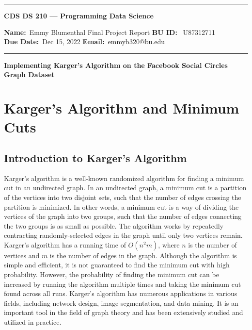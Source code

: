 \documentclass[10pt]{article}
\begin{document}
\begin{center}
	\hrule
	\vspace{.4cm}
	{\textbf { \large CDS DS 210 --- Programming Data Science}}
\end{center}
{\textbf{Name:}\ Emmy Blumenthal \hspace{\fill} Final Project Report\hspace{\fill}  \textbf{BU ID:} \ U87312711 \\
\textbf{Due Date:}\  Dec 15, 2022   \hspace{\fill} \textbf{Email:}\ emmyb320@bu.edu \ 
\vspace{.4cm}
\hrule

\begin{center}
	\Large 
	{
	\bf
	Implementing Karger's Algorithm on the Facebook Social Circles Graph Dataset
	}
\end{center}

\tableofcontents


\section{Karger's Algorithm and Minimum Cuts}

\subsection{Introduction to Karger's Algorithm}

Karger's algorithm is a well-known randomized algorithm for finding a minimum cut in an undirected graph.
In an undirected graph, a minimum cut is a partition of the vertices into two disjoint sets, such that the number of edges crossing the partition is minimized. In other words, a minimum cut is a way of dividing the vertices of the graph into two groups, such that the number of edges connecting the two groups is as small as possible.
The algorithm works by repeatedly contracting randomly-selected edges in the graph until only two vertices remain.
Karger's algorithm has a running time of $O(n^2m)$, where $n$ is the number of vertices and $m$ is the number of edges in the graph. Although the algorithm is simple and efficient, it is not guaranteed to find the minimum cut with high probability. However, the probability of finding the minimum cut can be increased by running the algorithm multiple times and taking the minimum cut found across all runs. Karger's algorithm has numerous applications in various fields, including network design, image segmentation, and data mining. It is an important tool in the field of graph theory and has been extensively studied and utilized in practice.

}
\end{document}
